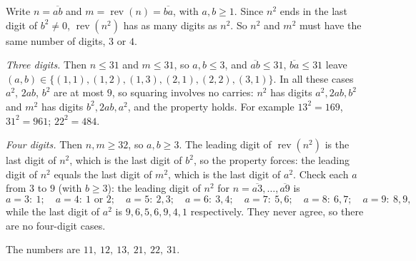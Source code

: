 Write $n=\overline{ab}$ and $m=\operatorname{rev}(n)=\overline{ba}$, with $a,b\ge1$. Since $n^2$ ends in the last digit of $b^2\ne0$, $\operatorname{rev}(n^2)$ has as many digits as $n^2$. So $n^2$ and $m^2$ must have the same number of digits, $3$ or $4$.

\emph{Three digits.} Then $n\le31$ and $m\le31$, so $a,b\le3$, and $\overline{ab}\le31$, $\overline{ba}\le31$ leave $(a,b)\in\{(1,1),(1,2),(1,3),(2,1),(2,2),(3,1)\}$. In all these cases $a^2$, $2ab$, $b^2$ are at most $9$, so squaring involves no carries: $n^2$ has digits $a^2,2ab,b^2$ and $m^2$ has digits $b^2,2ab,a^2$, and the property holds. For example $13^2=169$, $31^2=961$; $22^2=484$.

\emph{Four digits.} Then $n,m\ge32$, so $a,b\ge3$. The leading digit of $\operatorname{rev}(n^2)$ is the last digit of $n^2$, which is the last digit of $b^2$, so the property forces: the leading digit of $n^2$ equals the last digit of $m^2$, which is the last digit of $a^2$. Check each $a$ from $3$ to $9$ (with $b\ge3$): the leading digit of $n^2$ for $n=\overline{a3},\dots,\overline{a9}$ is
\[
a=3{:}\ 1;\quad a=4{:}\ 1\text{ or }2;\quad a=5{:}\ 2,3;\quad a=6{:}\ 3,4;\quad a=7{:}\ 5,6;\quad a=8{:}\ 6,7;\quad a=9{:}\ 8,9,
\]
while the last digit of $a^2$ is $9,6,5,6,9,4,1$ respectively. They never agree, so there are no four-digit cases.

The numbers are $\boxed{11,\ 12,\ 13,\ 21,\ 22,\ 31}$.
